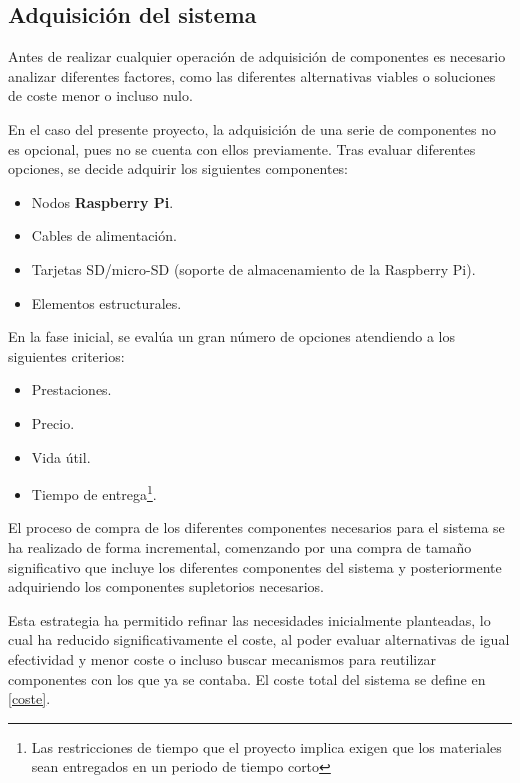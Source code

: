 
\subsection{Adquisición del sistema}
\label{adquisicion}
Antes de realizar cualquier operación de adquisición de componentes es necesario analizar diferentes factores, como las diferentes alternativas viables o soluciones de coste menor o incluso nulo.

En el caso del presente proyecto, la adquisición de una serie de componentes no es opcional, pues no se cuenta con ellos previamente. Tras evaluar diferentes opciones, se decide adquirir los siguientes componentes:

\begin{itemize}
  \item Nodos \textbf{Raspberry Pi}.
  \item Cables de alimentación.
  \item Tarjetas SD/micro-SD (soporte de almacenamiento de la Raspberry Pi).
  \item Elementos estructurales.
\end{itemize}

En la fase inicial, se evalúa un gran número de opciones atendiendo a los siguientes criterios:

\begin{itemize}
  \item Prestaciones.
  \item Precio.
  \item Vida útil.
  \item Tiempo de entrega\footnote{Las restricciones de tiempo que el proyecto implica exigen que los materiales sean entregados en un periodo de tiempo corto}.
\end{itemize}

El proceso de compra de los diferentes componentes necesarios para el sistema se ha realizado de forma incremental, comenzando por una compra de tamaño significativo que incluye los diferentes componentes del sistema y posteriormente adquiriendo los componentes supletorios necesarios.

Esta estrategia ha permitido refinar las necesidades inicialmente planteadas, lo cual ha reducido significativamente el coste, al poder evaluar alternativas de igual efectividad y menor coste o incluso buscar mecanismos para reutilizar componentes con los que ya se contaba. El coste total del sistema se define en \ref{coste}.

